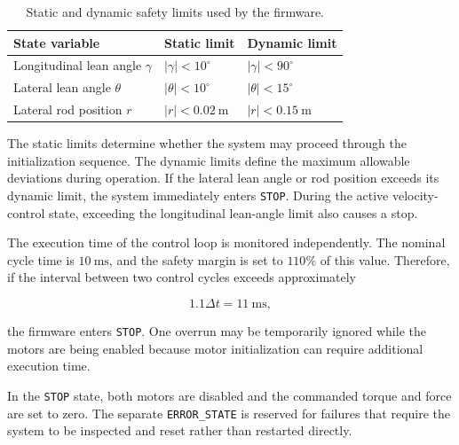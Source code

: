 \begin{table}[htbp]
  \centering
  \small
  \renewcommand{\arraystretch}{1.3}
  \caption{Static and dynamic safety limits used by the firmware.}
  \label{tab:embedded-safety-limits}
  \begin{tabular}{
    p{}
    p{}
    p{}
  }
    \hline
    \textbf{State variable}
    &
    \textbf{Static limit}
    &
    \textbf{Dynamic limit}
    \\
    \hline

    Longitudinal lean angle $\gamma$
    &
    $|\gamma|<10^\circ$
    &
    $|\gamma|<90^\circ$
    \\

    Lateral lean angle $\theta$
    &
    $|\theta|<10^\circ$
    &
    $|\theta|<15^\circ$
    \\

    Lateral rod position $r$
    &
    $|r|<0.02~\mathrm{m}$
    &
    $|r|<0.15~\mathrm{m}$
    \\

    \hline
  \end{tabular}
\end{table}

The static limits determine whether the system may proceed through the initialization sequence. The dynamic limits define the maximum allowable deviations during operation. If the lateral lean angle or rod position exceeds its dynamic limit, the system immediately enters \texttt{STOP}. During the active velocity-control state, exceeding the longitudinal lean-angle limit also causes a stop.

The execution time of the control loop is monitored independently. The nominal cycle time is $10~\mathrm{ms}$, and the safety margin is set to $110\%$ of this value. Therefore, if the interval between two control cycles exceeds approximately

\begin{equation}
1.1\Delta t=11~\mathrm{ms},
\end{equation}

the firmware enters \texttt{STOP}. One overrun may be temporarily ignored while the motors are being enabled because motor initialization can require additional execution time.

In the \texttt{STOP} state, both motors are disabled and the commanded torque and force are set to zero. The separate \texttt{ERROR\_STATE} is reserved for failures that require the system to be inspected and reset rather than restarted directly.

